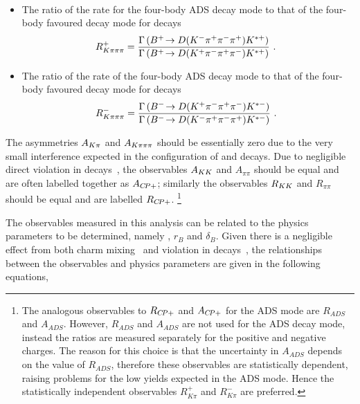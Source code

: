 \begin{itemize}
{{\begin{multline}
\label{eqn:Rpipipipi}
\end{multline}}}
\item{The ratio of the rate for the four-body ADS decay mode to that of the four-body favoured decay mode for \Bp decays
\begin{equation}
R^+_{K\pi\pi\pi} = \frac{\Gamma\left({{{B}^+}}\!\rightarrow {\ensuremath{D}}({{K}^-}{{\pi}^+}{{\pi}^-}{{\pi}^+}){{K}^{*+}}\right)}{\Gamma\left({{{B}^+}}\!\rightarrow {\ensuremath{D}}({{K}^+}{{\pi}^-}{{\pi}^+}{{\pi}^-}){{K}^{*+}}\right)} \text{ . }
\label{eqn:Rplus4body}
\end{equation}
}
\item{The ratio of the rate of the four-body ADS decay mode to that of the four-body favoured decay mode for \Bm decays
\begin{equation}
R^-_{K\pi\pi\pi} = \frac{\Gamma\left({{{B}^-}}\!\rightarrow {\ensuremath{D}}({{K}^+}{{\pi}^-}{{\pi}^+}{{\pi}^-}){{K}^{*-}}\right)}{\Gamma\left({{{B}^-}}\!\rightarrow {\ensuremath{D}}({{K}^-}{{\pi}^+}{{\pi}^-}{{\pi}^+}){{K}^{*-}}\right)} \text{ . }
\label{eqn:Rminus4body}
\end{equation}
}
\end{itemize}

\noindent
The asymmetries $A_{{K}\pi}$ and $A_{{K}\pi\pi\pi}$ should be essentially zero due to the very small interference expected in the configuration of \B and \D decays. Due to negligible direct \CP violation in \D decays~\cite{charmcpv}, the observables $A_{{K}{K}}$ and $A_{\pi\pi}$ should be equal and are often labelled together as $A_{{C\!P}+}$; similarly the observables $R_{{K}{K}}$ and $R_{\pi\pi}$ should be equal and are labelled $R_{{C\!P}+}$. \footnote{The analogous observables to $R_{{C\!P}+}$ and $A_{{C\!P}+}$ for the ADS mode are $R_{ADS}$ and $A_{ADS}$. However, $R_{ADS}$ and $A_{ADS}$ are not used for the ADS decay mode, instead the ratios are measured separately for the positive and negative charges. The reason for this choice is that the uncertainty in $A_{ADS}$ depends on the value of $R_{ADS}$, therefore these observables are statistically dependent, raising problems for the low yields expected in the ADS mode. Hence the statistically independent observables $R^+_{K\pi}$ and $R^-_{K\pi}$ are preferred.}

The \CP observables measured in this analysis can be related to the physics parameters to be determined, namely \Pgamma, $r_B$ and $\delta_B$. Given there is a negligible effect from both charm mixing~\cite{charmmixing} and \CP violation in \D decays~\cite{charmcpv}, the relationships between the \CP observables and physics parameters are given in the following equations,

